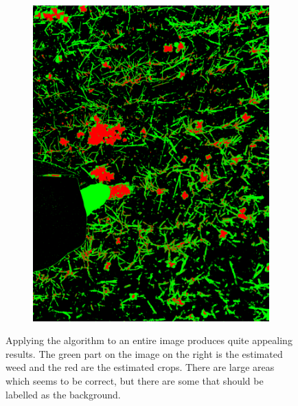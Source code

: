 \begin{figure}[H]
\begin{subfigure}[b]{0.49\textwidth}
        \includegraphics[width=\textwidth]{./figure/result/images/img_res.png}
    \end{subfigure}
    \caption{Applying the algorithm to an entire image produces quite appealing results. The green part on the image on the right is the estimated weed and the red are the estimated crops. There are large areas which seems to be correct, but there are some that should be labelled as the background. }
    \label{fig:visual_result}
\end{figure}

